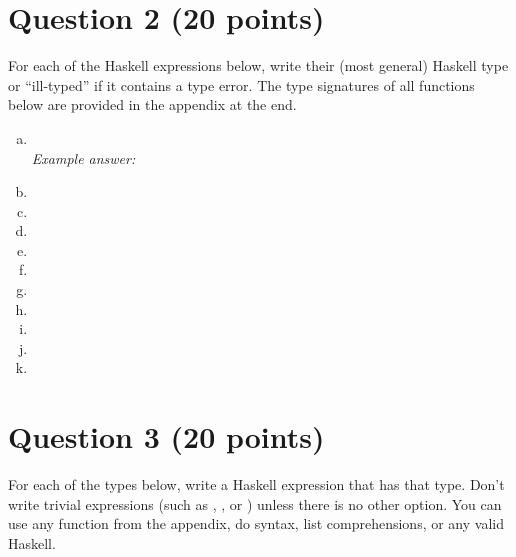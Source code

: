 \documentclass{article}
\begin{document}
\section*{Question 2 (20 points)}

For each of the Haskell expressions below, write their (most general)
Haskell type or ``ill-typed'' if it contains a type error. The type
signatures of all functions below are provided in the appendix at the
end.

\begin{enumerate}[(a)]
\itemsep2em
\item {} \\
  {\em Example answer:}\\
  \vspace*{-1.5em}
\item {}
\item {}
\item {}  
\item {}
\item {}
\item {}
\item {}
\item {}
\item {}  
\item {}
\end{enumerate}

\section*{Question 3 (20 points)}

For each of the types below, write a Haskell expression that has that
type.  Don't write trivial expressions (such as \haske{[]},
, or ) unless there is no other
option. You can use any function from the appendix, do syntax, list
comprehensions, or any valid Haskell.
\end{document}
